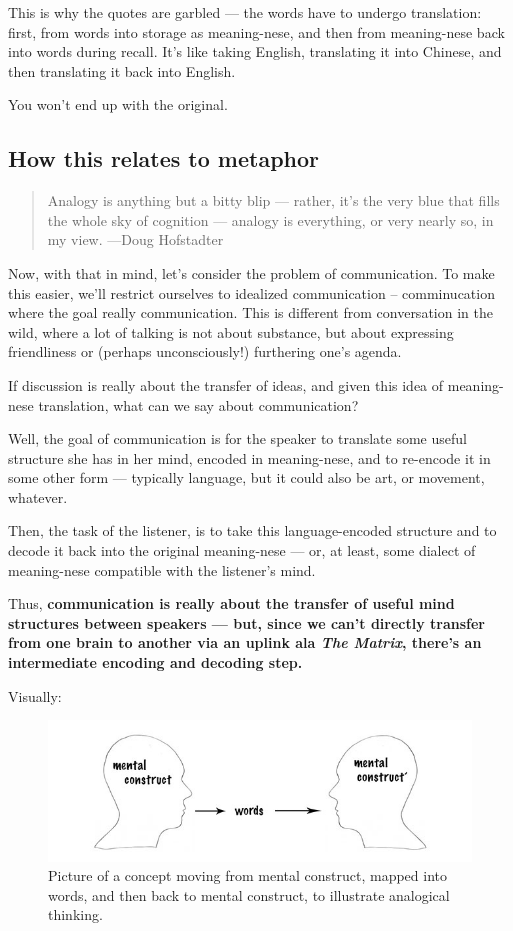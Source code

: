 This is why the quotes are garbled --- the
words have to undergo translation: first, from words into storage as meaning-nese, and then from meaning-nese back into words during recall.
It's like taking English, translating it into Chinese, and then
translating it back into English.

You won't end up with the original.

\subsection{How this relates to
metaphor}\label{how-this-relates-to-metaphor}

\begin{quote}
Analogy is anything but a bitty blip --- rather, it's the very blue that
fills the whole sky of cognition --- analogy is everything, or very
nearly so, in my view. \label{quote-attribute}{---Doug Hofstadter}
\end{quote}

Now, with that in mind, let's consider the problem of communication. To
make this easier, we'll restrict ourselves to idealized communication --
comminucation where the goal really  communication. This is different
from conversation in the wild, where a lot of talking is not about
substance, but about expressing friendliness or (perhaps unconsciously!)
furthering one's agenda.

If discussion is really about the transfer of ideas, and given this idea of
meaning-nese translation, what can we say about communication?

Well, the goal of communication is for the speaker to translate some
useful structure she has in her mind, encoded in meaning-nese, and to
re-encode it in some other form --- typically language, but it could also
be art, or movement, whatever.

Then, the task of the listener, is to take this language-encoded
structure and to decode it back into the original meaning-nese --- or, at
least, some dialect of meaning-nese compatible with the listener's mind.

Thus, \textbf{communication is really about the transfer of useful mind
structures between speakers --- but, since we can't directly transfer
from one brain to another via an uplink ala \emph{The Matrix}, there's
an intermediate encoding and decoding step.}

Visually:

\begin{figure}[htbp]
\centering
\includegraphics[width=\textwidth]{graphics/analogical-thinking.jpg}
\caption{Picture of a concept moving from mental construct, mapped into
words, and then back to mental construct, to illustrate analogical
thinking.}
\end{figure}

